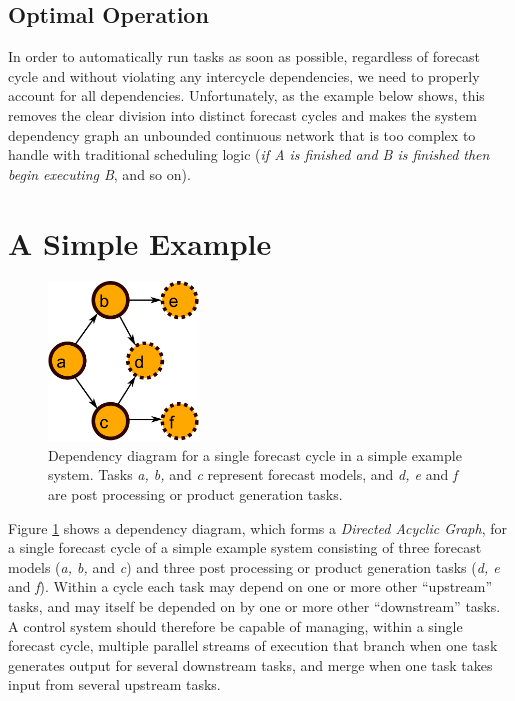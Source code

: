 \documentclass[11pt,a4paper]{article}
\begin{document}
\subsection{Optimal Operation}

In order to automatically run tasks as soon as possible, regardless of
forecast cycle and without violating any intercycle dependencies,  we
need to properly account for all dependencies. Unfortunately, as the
example below shows, this removes the clear division into distinct
forecast cycles and makes the system dependency graph an unbounded
continuous network that is too complex to handle with traditional
scheduling logic ({\em if A is finished and B is finished then begin
executing B}, and so on).  




\section{A Simple Example}

\begin{figure} 
    \begin{center}
    \includegraphics[width=4cm]{dependencies-one} 
    \end{center}
    \caption{\small Dependency diagram for a single forecast cycle in a
    simple example system. Tasks {\em a, b,} and {\em c} represent
    forecast models, and {\em d, e} and {\em f} are post processing or
    product generation tasks.} 
    \label{fig-dep-one} 
\end{figure} 

Figure \ref{fig-dep-one} shows a dependency diagram, which forms a {\em
Directed Acyclic Graph}, for a single forecast cycle of a simple example
system consisting of three forecast models ({\em a, b,} and {\em c}) and
three post processing or product generation tasks ({\em d, e} and {\em
f}).  Within a cycle each task may depend on one or more other
``upstream'' tasks, and may itself be depended on by one or more other
``downstream'' tasks.  A control system should therefore be capable of
managing, within a single forecast cycle, multiple parallel streams of
execution that branch when one task generates output for several
downstream tasks, and merge when one task takes input from several
upstream tasks. 
\end{document}
